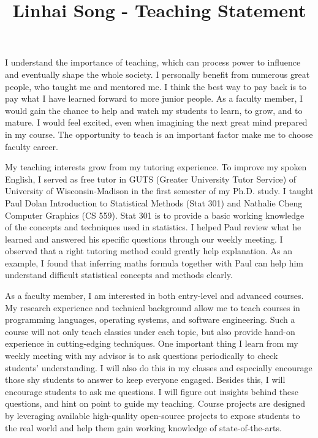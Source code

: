 \documentclass[10pt]{article}
\title{\vspace{-.7in}\bf{Linhai Song - Teaching Statement\vspace{-.4in}}}
\date{}
\begin{document}
\maketitle\vspace{-.2in}

I understand the importance of teaching, 
which can process power to influence and eventually shape the whole society. 
I personally benefit from numerous great people, who taught me and mentored me. 
I think the best way to pay back is to pay what I have learned forward to more junior people. 
As a faculty member, I would gain the chance to help and watch my students to learn, to grow, and to mature. 
I would feel excited, even when imagining the next great mind prepared in my course.
The opportunity to teach is an important factor make me to choose faculty career. 

My teaching interests grow from my tutoring experience. 
To improve my spoken English, 
I served as free tutor in GUTS (Greater University Tutor Service) of University of Wisconsin-Madison in the first semester of my Ph.D. study. 
I taught Paul Dolan Introduction to Statistical Methods (Stat 301) and Nathalie Cheng Computer Graphics (CS 559). 
Stat 301 is to provide a basic working knowledge of the concepts and techniques used in statistics. 
I helped Paul review what he learned and answered his specific questions through our weekly meeting. 
I observed that a right tutoring method could greatly help explanation. 
As an example, I found that inferring maths formula together with Paul can help him understand difficult statistical concepts and methods clearly. 



As a faculty member, I am interested in both entry-level and advanced courses. 
My research experience and technical background allow me to teach courses in programming languages, operating systems, and software engineering.
Such a course will not only teach classics under each topic, but also provide hand-on experience in cutting-edging techniques.
One important thing I learn from my weekly meeting with my advisor is to ask questions periodically to check students' understanding.
I will also do this in my classes and especially encourage those shy students to answer to keep everyone engaged. 
Besides this, I will encourage students to ask me questions. I will figure out insights behind these questions, and hint on point to guide my teaching. 
Course projects are designed by leveraging available high-quality open-source projects to 
expose students to the real world and help them gain working knowledge of state-of-the-arts. 

%
%
\end{document}
